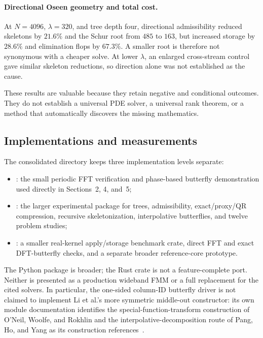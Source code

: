 \documentclass[11pt,a4paper]{article}
\begin{document}
\paragraph{Directional Oseen geometry and total cost.} At $N=4096$, $\lambda=320$, and tree depth four, directional admissibility reduced skeletons by $21.6\%$ and the Schur root from $485$ to $163$, but increased storage by $28.6\%$ and elimination flops by $67.3\%$. A smaller root is therefore not synonymous with a cheaper solve. At lower $\lambda$, an enlarged cross-stream control gave similar skeleton reductions, so direction alone was not established as the cause.

These results are valuable because they retain negative and conditional outcomes. They do not establish a universal PDE solver, a universal rank theorem, or a method that automatically discovers the missing mathematics.

\subsection{Implementations and measurements}
\label{sec:implementations}
The consolidated directory keeps three implementation levels separate:
\begin{itemize}
\item {}: the small periodic FFT verification and phase-based butterfly demonstration used directly in Sections~2, 4, and~5;
\item {}: the larger experimental package for trees, admissibility, exact/proxy/QR compression, recursive skeletonization, interpolative butterflies, and twelve problem studies;
\item {}: a smaller real-kernel apply/storage benchmark crate, direct FFT and exact DFT-butterfly checks, and a separate broader reference-core prototype.
\end{itemize}
The Python package is broader; the Rust crate is not a feature-complete port. Neither is presented as a production wideband FMM or a full replacement for the cited solvers. In particular, the one-sided column-ID butterfly driver is not claimed to implement Li et al.'s more symmetric middle-out constructor: its own module documentation identifies the special-function-transform construction of O'Neil, Woolfe, and Rokhlin and the interpolative-decomposition route of Pang, Ho, and Yang as its construction references~\cite{oneill2010butterfly,pang2018idbf}.
\end{document}
